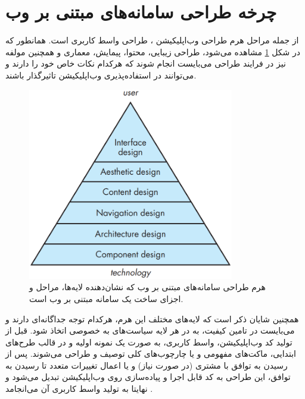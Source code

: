 \section{چرخه طراحی سامانه‌های مبتنی بر وب}
از جمله مراحل هرم طراحی وب‌اپلیکیشن
\cite{pressman_software_2015}،
طراحی واسط کاربری است.  همانطور که در شکل
\ref{fig:pyramid}
مشاهده می‌شود، طراحی زیبایی، محتوا، پیمایش، معماری و همچنین مولفه نیز در فرایند طراحی می‌بایست انجام شوند که هرکدام نکات خاص خود را دارند و می‌توانند در استفاده‌پذیری وب‌اپلیکیشن تاثیرگذار باشند.
\begin{figure}[H]
	\centering\includegraphics[width=9cm]{Resources/pyramid.PNG}
	\caption[هرم طراحی سامانه‌های مبتنی بر وب]
	{هرم طراحی سامانه‌های مبتنی بر وب
		\cite{pressman_software_2015}
		که نشان‌دهنده لایه‌ها، مراحل و اجزای ساخت یک سامانه مبتنی بر وب است.
	}
	\label{fig:pyramid}
\end{figure}
همچنین شایان ذکر است که لایه‌های مختلف این هرم، هرکدام توجه جداگانه‌ای دارند و می‌بایست در تامین کیفیت، به در هر لایه سیاست‌های به خصوصی اتخاذ شود. قبل از تولید کد وب‌اپلیکیشن، واسط کاربری، به صورت یک نمونه اولیه و در قالب طرح‌های ابتدایی، ماکت‌های مفهومی و یا چارچوب‌های کلی توصیف و طراحی می‌شوند. پس از رسیدن به توافق با مشتری (در صورت نیاز) و یا اعمال تغییرات متعدد تا رسیدن به توافق، این طراحی به کد قابل اجرا و پیاده‌سازی روی وب‌اپلیکیشن تبدیل می‌شود و نهایتا به تولید واسط کاربری آن می‌انجامد
\cite{sommerville_software_2016}.

